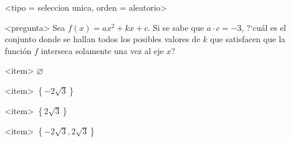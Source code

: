 <tipo = seleccion unica, orden = aleatorio>

<pregunta>
Sea $f(x)=ax^2+kx+c$. Si se sabe que $a\cdot c=-3$, ?`cu\'al es el conjunto donde se hallan todos los posibles valores de $k$ que satisfacen que la funci\'on $f$ interseca solamente una vez al eje $x$?


<item>
$\varnothing$

<item>
$\left\{-2\sqrt{3}\right\}$

<item>
$\left\{2\sqrt{3}\right\}$

<item>
$\left\{-2\sqrt{3},2\sqrt{3}\right\}$



